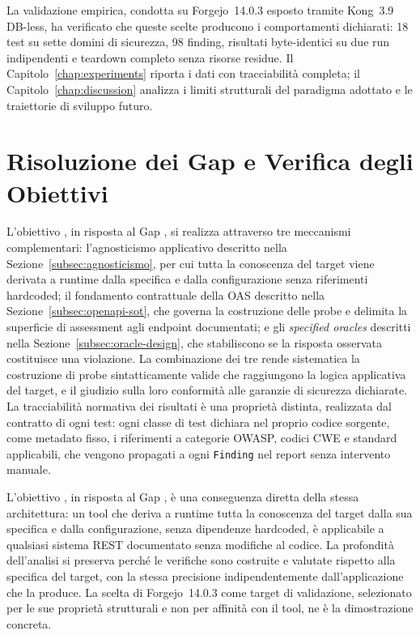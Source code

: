 La validazione empirica, condotta su Forgejo~14.0.3 esposto tramite Kong~3.9 DB-less, ha verificato che queste scelte producono i comportamenti dichiarati: 18 test su sette domini di sicurezza, 98 finding, risultati byte-identici su due run indipendenti e teardown completo senza risorse residue. Il Capitolo~\ref{chap:experiments} riporta i dati con tracciabilità completa; il Capitolo~\ref{chap:discussion} analizza i limiti strutturali del paradigma adottato e le traiettorie di sviluppo futuro.





\section{Risoluzione dei Gap e Verifica degli Obiettivi}%
\label{sec:verifica-obiettivi}

L'obiettivo , in risposta al Gap , si realizza attraverso tre meccanismi complementari: l'agnosticismo applicativo descritto nella Sezione~\ref{subsec:agnosticismo}, per cui tutta la conoscenza del target viene derivata a runtime dalla specifica e dalla configurazione senza riferimenti hardcoded; il fondamento contrattuale della \gls{OAS} descritto nella Sezione~\ref{subsec:openapi-sot}, che governa la costruzione delle probe e delimita la superficie di assessment agli endpoint documentati; e gli \textit{specified oracles} descritti nella Sezione~\ref{subsec:oracle-design}, che stabiliscono se la risposta osservata costituisce una violazione. La combinazione dei tre rende sistematica la costruzione di probe sintatticamente valide che raggiungono la logica applicativa del target, e il giudizio sulla loro conformità alle garanzie di sicurezza dichiarate. La tracciabilità normativa dei risultati è una proprietà distinta, realizzata dal contratto di ogni test: ogni classe di test dichiara nel proprio codice sorgente, come metadato fisso, i riferimenti a categorie \gls{OWASP}, codici \gls{CWE} e standard applicabili, che vengono propagati a ogni \texttt{Finding} nel report senza intervento manuale.

L'obiettivo , in risposta al Gap , è una conseguenza diretta della stessa architettura: un tool che deriva a runtime tutta la conoscenza del target dalla sua specifica e dalla configurazione, senza dipendenze hardcoded, è applicabile a qualsiasi sistema REST documentato senza modifiche al codice. La profondità dell'analisi si preserva perché le verifiche sono costruite e valutate rispetto alla specifica del target, con la stessa precisione indipendentemente dall'applicazione che la produce. La scelta di Forgejo~14.0.3 come target di validazione, selezionato per le sue proprietà strutturali e non per affinità con il tool, ne è la dimostrazione concreta.

